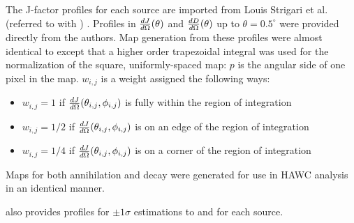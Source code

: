 The J-factor profiles for each source are imported from Louis Strigari et al. (referred to with \LS) \cite{DM_Strigari20}.
Profiles in $\frac{dJ}{d\Omega} (\theta)$ and $\frac{dD}{d\Omega} (\theta)$ up to $\theta = 0.5^{\circ}$ were provided directly from the authors.
Map generation from these profiles were almost identical to  except that a higher order trapezoidal integral was used for the normalization of the square, uniformly-spaced map:
\TrapIntegral
$p$ is the angular side of one pixel in the map.
$w_{i,j}$ is a weight assigned the following ways:
\begin{itemize}
    \item[] $w_{i,j} = 1$ if $\frac{dJ}{d\Omega}(\theta_{i,j}, \phi_{i,j})$ is fully within the region of integration
    \item[] $w_{i,j} = 1/2$ if $\frac{dJ}{d\Omega}(\theta_{i,j}, \phi_{i,j})$ is on an edge of the region of integration
    \item[] $w_{i,j} = 1/4$ if $\frac{dJ}{d\Omega}(\theta_{i,j}, \phi_{i,j})$ is on a corner of the region of integration
\end{itemize}
Maps for both annihilation and decay were generated for use in HAWC analysis in an identical manner.

\LS also provides profiles for $\pm1 \sigma$ estimations to \J and \D for each source.



